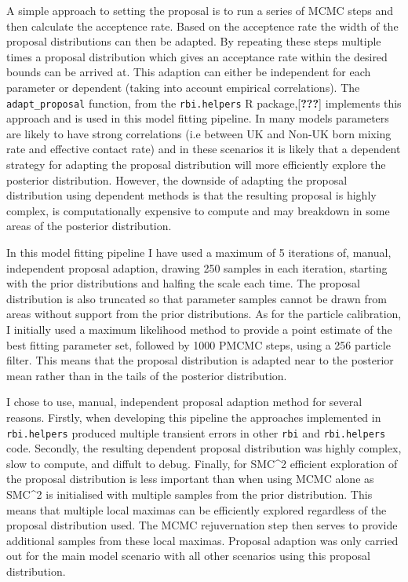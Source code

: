 \documentclass[11pt,twoside]{bristolthesis}
\begin{document}
  A simple approach to setting the proposal is to run a series of MCMC steps and then calculate the acceptence rate. Based on the acceptence rate the width of the proposal distributions can then be adapted. By repeating these steps multiple times a proposal distribution which gives an acceptance rate within the desired bounds can be arrived at. This adaption can either be independent for each parameter or dependent (taking into account empirical correlations). The \texttt{adapt\_proposal} function, from the \texttt{rbi.helpers} R package,{[}{\textbf{???}}{]} implements this approach and is used in this model fitting pipeline. In many models parameters are likely to have strong correlations (i.e between UK and Non-UK born mixing rate and effective contact rate) and in these scenarios it is likely that a dependent strategy for adapting the proposal distribution will more efficiently explore the posterior distribution. However, the downside of adapting the proposal distribution using dependent methods is that the resulting proposal is highly complex, is computationally expensive to compute and may breakdown in some areas of the posterior distribution.
  
  In this model fitting pipeline I have used a maximum of 5 iterations of, manual, independent proposal adaption, drawing 250 samples in each iteration, starting with the prior distributions and halfing the scale each time. The proposal distribution is also truncated so that parameter samples cannot be drawn from areas without support from the prior distributions. As for the particle calibration, I initially used a maximum likelihood method to provide a point estimate of the best fitting parameter set, followed by 1000 PMCMC steps, using a 256 particle filter. This means that the proposal distribution is adapted near to the posterior mean rather than in the tails of the posterior distribution.
  
  I chose to use, manual, independent proposal adaption method for several reasons. Firstly, when developing this pipeline the approaches implemented in \texttt{rbi.helpers} produced multiple transient errors in other \texttt{rbi} and \texttt{rbi.helpers} code. Secondly, the resulting dependent proposal distribution was highly complex, slow to compute, and diffult to debug. Finally, for SMC\^{}2 efficient exploration of the proposal distribution is less important than when using MCMC alone as SMC\^{}2 is initialised with multiple samples from the prior distribution. This means that multiple local maximas can be efficiently explored regardless of the proposal distribution used. The MCMC rejuvernation step then serves to provide additional samples from these local maximas. Proposal adaption was only carried out for the main model scenario with all other scenarios using this proposal distribution.
  
\end{document}
